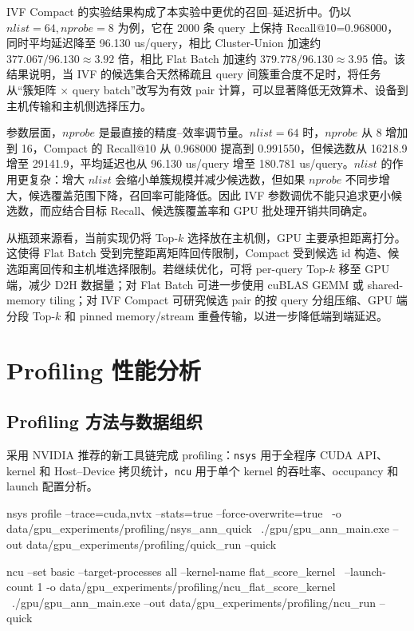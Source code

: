 \documentclass[a4paper]{article}
\begin{document}
IVF Compact 的实验结果构成了本实验中更优的召回--延迟折中。仍以 $nlist=64,nprobe=8$ 为例，它在 2000 条 query 上保持 Recall@10=0.968000，同时平均延迟降至 96.130 us/query，相比 Cluster-Union 加速约 $377.067/96.130\approx3.92$ 倍，相比 Flat Batch 加速约 $379.778/96.130\approx3.95$ 倍。该结果说明，当 IVF 的候选集合天然稀疏且 query 间簇重合度不足时，将任务从“簇矩阵 $\times$ query batch”改写为有效 pair 计算，可以显著降低无效算术、设备到主机传输和主机侧选择压力。

参数层面，$nprobe$ 是最直接的精度--效率调节量。$nlist=64$ 时，$nprobe$ 从 8 增加到 16，Compact 的 Recall@10 从 0.968000 提高到 0.991550，但候选数从 16218.9 增至 29141.9，平均延迟也从 96.130 us/query 增至 180.781 us/query。$nlist$ 的作用更复杂：增大 $nlist$ 会缩小单簇规模并减少候选数，但如果 $nprobe$ 不同步增大，候选覆盖范围下降，召回率可能降低。因此 IVF 参数调优不能只追求更小候选数，而应结合目标 Recall、候选簇覆盖率和 GPU 批处理开销共同确定。

从瓶颈来源看，当前实现仍将 Top-$k$ 选择放在主机侧，GPU 主要承担距离打分。这使得 Flat Batch 受到完整距离矩阵回传限制，Compact 受到候选 id 构造、候选距离回传和主机堆选择限制。若继续优化，可将 per-query Top-$k$ 移至 GPU 端，减少 D2H 数据量；对 Flat Batch 可进一步使用 cuBLAS GEMM 或 shared-memory tiling；对 IVF Compact 可研究候选 pair 的按 query 分组压缩、GPU 端分段 Top-$k$ 和 pinned memory/stream 重叠传输，以进一步降低端到端延迟。


\section{Profiling 性能分析}

\subsection{Profiling 方法与数据组织}

采用 NVIDIA 推荐的新工具链完成 profiling：\texttt{nsys} 用于全程序 CUDA API、kernel 和 Host--Device 拷贝统计，\texttt{ncu} 用于单个 kernel 的吞吐率、occupancy 和 launch 配置分析。

\begin{bash}
nsys profile --trace=cuda,nvtx --stats=true --force-overwrite=true \
  -o data/gpu_experiments/profiling/nsys_ann_quick \
  ./gpu/gpu_ann_main.exe --out data/gpu_experiments/profiling/quick_run --quick

ncu --set basic --target-processes all --kernel-name flat_score_kernel \
  --launch-count 1 -o data/gpu_experiments/profiling/ncu_flat_score_kernel \
  ./gpu/gpu_ann_main.exe --out data/gpu_experiments/profiling/ncu_run --quick
\end{bash}
\end{document}
